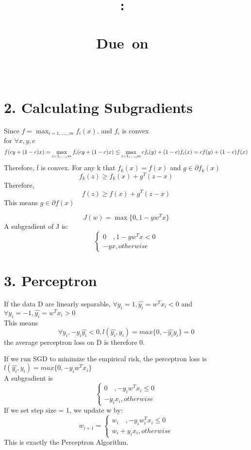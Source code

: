 \documentclass{article}
\title{
    \vspace{2in}
    \textmd{\textbf{\hmwkClass:\ \hmwkTitle \\ \hmwksubtitle }}\\
    \vspace{1in}
    \normalsize\vspace{0.1in}\small{Due\ on\ \hmwkDueDate}\\
    \vspace{0.1in}\large{\textit{\hmwkClassInstructor}}
    \vspace{3in}
}
\author{\textbf{\hmwkAuthorName} \\ \textbf{\hmwknetid }}
\date{}
\newenvironment{problem}[2][$\bullet$]{\begin{trivlist}\large
		\item[\hskip \labelsep {\bfseries #1}\hskip \labelsep {\bfseries #2.}]}  {\end{trivlist}}
\newenvironment{sub}[2][$-$]{\begin{trivlist}
		\item[\hskip \labelsep {\bfseries #1}\hskip \labelsep {\bfseries #2.}]}  {\end{trivlist}}
\begin{document}
\maketitle

\pagebreak

\section{2. Calculating  Subgradients}

\begin{problem}{2.1 Subgradients for pointwise maximum of functions}
\end{problem}
Since $f = \max_{i=1,\ldots,,m}f_{i}(x)$. and $f_i $ is convex\\
for $\forall x,y,c$$$f(cy+(1-c)x) = \max_{i=1,\ldots,,m}f_{i}(cy+(1-c)x) \leq \max_{i=1,\ldots,,m} cf_i(y) + (1-c)f_i(x)\\ = cf(y) + (1-c)f(x)$$
Therefore, f is convex.  For any k that $f_k(x) = f(x)$ and $g \in \partial f_k(x) $
$$f_k(z) \geq f_k(x) + g^T (z-x)$$ Therefore, $$f(z) \geq f(x) + g^T(z-x)$$
This means $g \in \partial f(x)$

\begin{problem}{2.2 Subgradient of hinge loss for linear prediction}
\end{problem}
$$J(w) = \max \{0,1-yw^Tx\}$$
A subgradient of J is:\\
$$\begin{cases}
0 \quad , 1 -yw^Tx <0\\
-yx, otherwise
\end{cases}$$

\section{3. Perceptron}
\begin{sub}{3.1}
\end{sub}
If the data D are linearly separable, $\forall y_i = 1, \hat{y_i}= w^Tx_i <0 $ and $\forall y_i =-1, \hat{y_i} = w^Tx_i >0$ \\
This means $$\forall y_i, -y_i\hat{y_i} <0, l(\hat{y_i},y_i) = max\{0,-\hat{y_i}y_i\} = 0$$
the average perceptron loss on D is therefore 0. 

\begin{sub}{3.2}
\end{sub}
If we run SGD to minimize the empirical risk, the perceptron loss is  $ l(\hat{y_i},y_i) = max\{0,-y_iw^Tx_i\}$\\
A subgradient is $$\begin{cases}
0 \quad , -y_iw^Tx_i \leq 0\\
-y_ix_i, otherwise
\end{cases}$$
If we set step size = 1, we update w by:
$$w_{i+1} = \begin{cases}
w_i \quad , -y_iw_i^Tx_i \leq 0\\
w_i+y_ix_i, otherwise
\end{cases}$$
This is exactly the Perceptron Algorithm. 
\pagebreak
\end{document}
